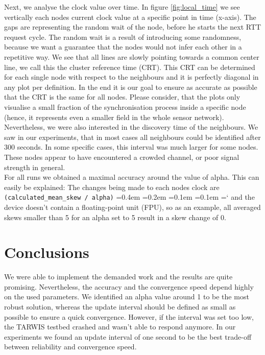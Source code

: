 \documentclass{llncs}
\newcommand{\code}[1]{%
	\texttt{#1}%
	\fontdimen2\font=0.4em
	\fontdimen3\font=0.2em
	\fontdimen4\font=0.1em
	\fontdimen7\font=0.1em
	\hyphenchar\font=`\-
}
\begin{document}
\noindent Next, we analyse the clock value over time. In figure \ref{fig:local_time} we see vertically each nodes current clock value at a specific point in time (x-axis). The gaps are representing the random wait of the node, before he starts the next RTT request cycle. The random wait is a result of introducing some randomness, because we want a guarantee that the nodes would not infer each other in a repetitive way. We see that all lines are slowly pointing towards a common center line, we call this the cluster reference time (CRT). This CRT can be determined for each single node with respect to the neighbours and it is perfectly diagonal in any plot per definition. In the end it is our goal to ensure as accurate as possible that the CRT is the same for all nodes. Please consider, that the plots only visualise a small fraction of the synchronisation process inside a specific node (hence, it represents even a smaller field in the whole sensor network).\\

\noindent Nevertheless, we were also interested in the discovery time of the neighbours. We saw in our experiments, that  in most cases all neighbours could be identified after 300 seconds. In some specific cases, this interval was much larger for some nodes. These nodes appear to have encountered a crowded channel, or poor signal strength in general.\\

\noindent For all runs we obtained a maximal accuracy around the value of alpha. This can easily be explained: The changes being made to each nodes clock are \code{(calculated\_mean\_skew / alpha)} and the device doesn't contain a float\-ing-point unit (FPU), so as an example, all averaged skews smaller than 5 for an alpha set to 5 result in a skew change of 0.

\section{Conclusions}

We were able to implement the demanded work and the results are quite promising. Nevertheless, the accuracy and the convergence speed depend highly on the used parameters. We identified an alpha value around 1 to be the most robust solution, whereas the update interval should be defined as small as possible to ensure a quick convergence. However, if the interval was set too low, the TARWIS testbed crashed and wasn't able to respond anymore. In our experiments we found an update interval of one second to be the best trade-off between reliability and convergence speed. 

{}



%
%
\end{document}
